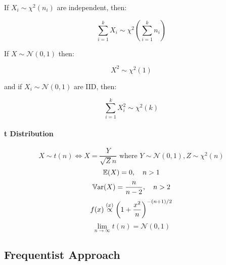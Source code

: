 \documentclass[a4paper]{article}
\begin{document}
                If $X_i \sim \chi^2(n_i)$ are independent, then:

                \[
                    \sum_{i=1}^k X_i \sim \chi^2\left(\sum_{i=1}^k n_i\right)
                \]

                If $X \sim \mathcal{N}(0, 1)$ then:

                \[
                    X^2 \sim \chi^2(1)
                \]

                and if $X_i \sim \mathcal{N}(0, 1)$ are IID, then:

                \[
                    \sum_{i=1}^k X_i^2 \sim \chi^2(k)
                \]

            \paragraph{t Distribution}
                \[
                    X \sim t(n) \iff X = \frac{Y}{\sqrt{Z}{n}} \text{ where }
                    Y \sim \mathcal{N}(0, 1), Z \sim \chi^2(n)
                \]
                \[
                    \mathbb{E}(X) = 0, \quad n > 1
                \]
                \[
                    \mathbb{V}\text{ar}(X) = \frac{n}{n - 2}, \quad n > 2
                \]
                \[
                    f(x) \stackrel{({x})}{\propto} \left(1 + \frac{x^2}{n}\right)^{-(n + 1)/2}
                \]
                \[
                    \lim_{n \to \infty} t(n) = \mathcal{N}(0, 1)
                \]

        \subsection*{Frequentist Approach}
\end{document}
